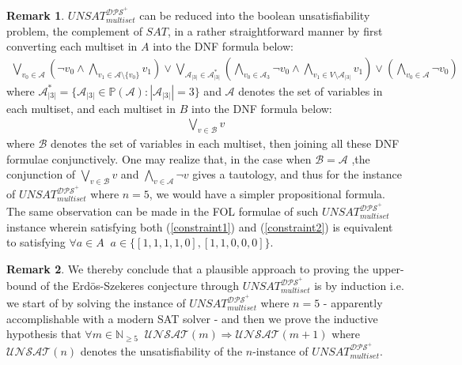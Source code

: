 \documentclass[11pt, oneside]{article}      %
\theoremstyle{definition}
\numberwithin{equation}{section}
\newtheorem*{remark}{Remark}
\newcommand{\reff}[1]{(\ref{#1})}
\theoremstyle{c}
\begin{document}
\begin{remark} $UNSAT_{multiset}^{\mathscr{DPS}^+}$ can be reduced into the boolean unsatisfiability problem, the complement of $SAT$, in a rather straightforward manner by first converting each multiset in $A$ into the DNF formula below:
\begin{align}
\bigvee_{v_0 \in \mathcal{A}} (\neg v_0 \land \bigwedge_{v_1 \in \mathcal{A} \setminus \{v_0\}} v_1  ) \lor \bigvee_{\mathcal{A}_{|3|} \in \mathcal{A}_{|3|}^*}( \bigwedge_{v_0 \in \mathcal{A}_3} \neg v_0 \land  \bigwedge_{v_1 \in V \setminus \mathcal{A}_{|3|}} v_1  )  \lor  ( \bigwedge_{v_0 \in \mathcal{A}} \neg v_0  )
\end{align}
where $\mathcal{A}_{|3|}^* = \{ \mathcal{A}_{|3|} \in \mathbb{P}(\mathcal{A}): |\mathcal{A}_{|3|}|=3 \}$ and $\mathcal{A}$ denotes the set of variables in each multiset, and each multiset in $B$ into the DNF formula
 below:\begin{align}
\bigvee_{v \in \mathcal{B}} v
\end{align}
where $\mathcal{B}$ denotes the set of variables in each multiset, then joining all these DNF formulae conjunctively. One may realize that, in the case when $\mathcal{B}=\mathcal{A}$ ,the conjunction of $\bigvee_{v \in \mathcal{B}} v$ and $\bigwedge_{v \in \mathcal{A}} \neg v$ gives a tautology, and thus for the instance of $UNSAT_{multiset}^{\mathscr{DPS}^+}$ where $n=5$, we would have a simpler propositional formula. The same observation can be made in the FOL formulae of such $UNSAT_{multiset}^{\mathscr{DPS}^+}$ instance wherein satisfying both \reff{constraint1}  and \reff{constraint2} is equivalent to satisfying $\forall a \in A \; \; a \in \{ [1,1,1,1,0],  [1,1,0,0,0] \}$.
\end{remark}
\begin{remark}
We thereby conclude that a plausible approach to proving the upper-bound of the Erd{\"o}s-Szekeres conjecture through $UNSAT_{multiset}^{\mathscr{DPS}^+}$ is by induction i.e. we start of by solving the instance of $UNSAT_{multiset}^{\mathscr{DPS}^+}$ where $n=5$ - apparently accomplishable with a modern SAT solver - and then we prove the inductive hypothesis that $\forall m \in \mathbb{N}_{\geq 5} \; \; \mathcal{UNSAT}(m) \Rightarrow \mathcal{UNSAT}(m+1)$ where $\mathcal{UNSAT}(n)$ denotes the unsatisfiability of the $n$-instance of $UNSAT_{multiset}^{\mathscr{DPS}^+}$.
\end{remark}
\end{document}
